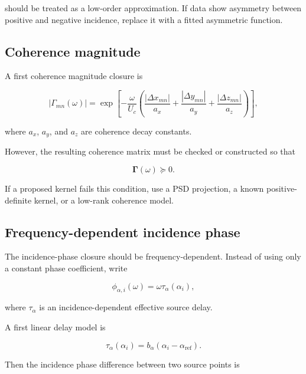 \documentclass[11pt]{article}
\newcommand{\mat}[1]{\bm{#1}}
\begin{document}
should be treated as a low-order approximation. If data show asymmetry between positive and negative incidence, replace it with a fitted asymmetric function.

\subsection{Coherence magnitude}

A first coherence magnitude closure is

\begin{equation}
    |\Gamma_{mn}(\omega)|
    =
    \exp
    \left[
        -
        \frac{\omega}{U_c}
        \left(
            \frac{|\Delta x_{mn}|}{a_x}
            +
            \frac{|\Delta y_{mn}|}{a_y}
            +
            \frac{|\Delta z_{mn}|}{a_z}
        \right)
    \right],
\end{equation}

where $a_x$, $a_y$, and $a_z$ are coherence decay constants.

However, the resulting coherence matrix must be checked or constructed so that

\begin{equation}
    \mat{\Gamma}(\omega)\succeq 0.
\end{equation}

If a proposed kernel fails this condition, use a PSD projection, a known positive-definite kernel, or a low-rank coherence model.

\subsection{Frequency-dependent incidence phase}

The incidence-phase closure should be frequency-dependent. Instead of using only a constant phase coefficient, write

\begin{equation}
    \phi_{\alpha,i}(\omega)
    =
    \omega \tau_{\alpha}(\alpha_i),
\end{equation}

where $\tau_{\alpha}$ is an incidence-dependent effective source delay.

A first linear delay model is

\begin{equation}
    \tau_{\alpha}(\alpha_i)
    =
    b_{\alpha}(\alpha_i-\alpha_{\mathrm{ref}}).
\end{equation}

Then the incidence phase difference between two source points is
\end{document}
